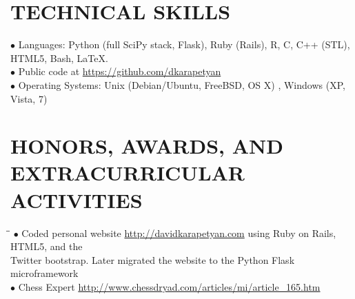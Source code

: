 \documentclass{resume}
\begin{document}
\begin{resume}
\section{TECHNICAL SKILLS}
\vspace{-0.05mm}
\begin{tabbing}
$\bullet$ Languages: Python (full SciPy stack, Flask), Ruby (Rails), R, C, C++
(STL), HTML5, Bash, \LaTeX{}.
\\
$\bullet$ Public code at \url{https://github.com/dkarapetyan}
\\
$\bullet$ Operating Systems: Unix (Debian/Ubuntu, FreeBSD, OS X) , Windows (XP, Vista, 7) 
\end{tabbing}

\section{HONORS, AWARDS, AND EXTRACURRICULAR ACTIVITIES} 
\vspace{-0.05mm}
\begin{tabbing}
\hspace{2.3in}\= \hspace{2.6in}\= \kill
$\bullet$ Coded personal website \url{http://davidkarapetyan.com} using Ruby on 
Rails, HTML5, and the \\  \phantom{$\bullet$} Twitter bootstrap. Later migrated
the website to the Python Flask microframework
\\
$\bullet$ Chess Expert \url{http://www.chessdryad.com/articles/mi/article_165.htm}
\end{tabbing}
\end{resume}
%
\end{document}
